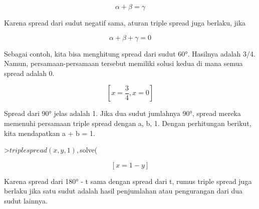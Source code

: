 \documentclass[12pt,arial,letterpaper]{book}
\begin{document}
\begin{eulercomment}
\begin{eulercomment}
\begin{eulercomment}
\begin{eulercomment}
\begin{eulercomment}
\begin{eulercomment}
\begin{eulercomment}
\begin{eulercomment}
\begin{eulercomment}
\begin{eulercomment}
\begin{eulercomment}
\begin{eulercomment}
\begin{eulercomment}
\begin{eulercomment}
\begin{eulercomment}
\begin{eulercomment}
\begin{eulercomment}
\begin{eulercomment}
\begin{eulercomment}
\begin{eulercomment}
\begin{eulercomment}
\begin{eulercomment}
\begin{eulercomment}
\begin{eulercomment}
\begin{eulercomment}
\begin{eulercomment}
\begin{eulercomment}
\begin{eulercomment}
\begin{eulercomment}
\end{eulercomment}
\begin{eulerformula}
\[
\alpha+\beta=\gamma
\]
\end{eulerformula}
\begin{eulercomment}
Karena spread dari sudut negatif sama, aturan triple spread juga
berlaku, jika

\end{eulercomment}
\begin{eulerformula}
\[
\alpha+\beta+\gamma=0
\]
\end{eulerformula}
\begin{eulercomment}
Sebagai contoh, kita bisa menghitung spread dari sudut 60°. Hasilnya
adalah 3/4. Namun, persamaan-persamaan tersebut memiliki solusi kedua
di mana semua spread adalah 0.
\end{eulercomment}
\begin{eulerformula}
\[
\left[ x=\frac{3}{4} , x=0 \right] 
\]
\end{eulerformula}
\begin{eulercomment}
Spread dari 90° jelas adalah 1. Jika dua sudut jumlahnya 90°, spread
mereka memenuhi persamaan triple spread dengan a, b, 1. Dengan
perhitungan berikut, kita mendapatkan a + b = 1.
\end{eulercomment}
\begin{eulerprompt}
>$triplespread(x,y,1), $solve(%
\end{eulerprompt}
\begin{eulerformula}
\[
\left[ x=1-y \right] 
\]
\end{eulerformula}
\begin{eulercomment}
Karena spread dari 180° - t sama dengan spread dari t, rumus triple
spread juga berlaku jika satu sudut adalah hasil penjumlahan atau
pengurangan dari dua sudut lainnya.


\end{eulercomment}
\end{eulercomment}
\end{eulercomment}
\end{eulercomment}
\end{eulercomment}
\end{eulercomment}
\end{eulercomment}
\end{eulercomment}
\end{eulercomment}
\end{eulercomment}
\end{eulercomment}
\end{eulercomment}
\end{eulercomment}
\end{eulercomment}
\end{eulercomment}
\end{eulercomment}
\end{eulercomment}
\end{eulercomment}
\end{eulercomment}
\end{eulercomment}
\end{eulercomment}
\end{eulercomment}
\end{eulercomment}
\end{eulercomment}
\end{eulercomment}
\end{eulercomment}
\end{eulercomment}
\end{eulercomment}
\end{eulercomment}
\end{document}
